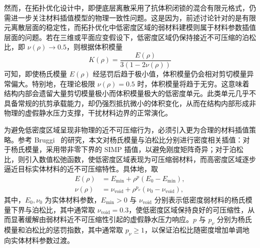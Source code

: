 

然而，在拓扑优化设计中，即便底层离散采用了抗体积闭锁的混合有限元格式，仍需进一步关注材料插值模型的物理一致性问题。这是因为，前述讨论针对的是有限元离散层面的稳定性，而拓扑优化中低密度区域的弱材料建模则属于材料参数插值层面的问题。若在三维或平面应变假设下，低密度区域仍保持接近不可压缩的泊松比，即 $\nu(\rho)\to0.5$，则根据体积模量
\[
K(\rho)=\frac{E(\rho)}{3(1-2\nu(\rho))}
\]
可知，即使杨氏模量 $E(\rho)$ 经惩罚后趋于极小值，体积模量仍会相对剪切模量异常偏大。特别地，在理论极限 $\nu(\rho)=0.5$ 时，体积模量将趋于无穷。这意味着结构内部会遗留大量剪切模量极小而体积模量极大的低密度单元。此类单元几乎不具备常规的抗剪承载能力，却仍强烈抵抗微小的体积变化，从而在结构内部形成非物理的虚假静水压力支撑，干扰材料边界的正常演化。

为避免低密度区域呈现非物理的近不可压缩行为，必须引入更为合理的材料插值策略。参考 Bruggi~\cite{bruggiTopologyOptimizationIncompressible2007a} 的研究，本文对杨氏模量与泊松比分别进行密度相关插值：对于杨氏模量，采用带非零下界的 SIMP 插值，以避免刚度矩阵奇异；对于泊松比，则引入数值松弛函数，使低密度区域表现为可压缩弱材料，而高密度区域逐步逼近目标实体材料的近不可压缩特性。具体地，取
\[
\begin{aligned}  
	E(\rho) &= E_{\min} + \rho^p (E_{0} - E_{\min}), \\  
	\nu(\rho) &= \nu_{\text{void}} + \rho^{p_{\nu}} (\nu_{0} - \nu_{\text{void}}),  
\end{aligned}
\]
其中，$E_0,\nu_0$ 为实体材料参数，$E_{\min}>0$ 与 $\nu_{\mathrm{void}}$ 分别表示低密度弱材料的杨氏模量下界与泊松比，其中通常取 $\nu_{\mathrm{void}}=0.3$，使低密度区域保持良好的可压缩性，从而显著缓解由弱材料近不可压缩性引起的虚假静水压力响应。$p$ 与 $p_\nu$ 分别为杨氏模量和泊松比的惩罚指数，其中通常取 $p_\nu\ge 1$，以保证泊松比随密度增加单调地向实体材料参数过渡。

